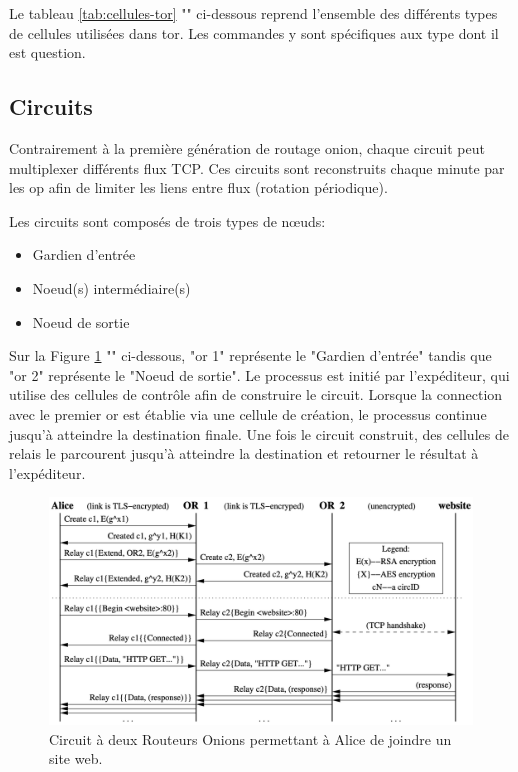 Le tableau \ref{tab:cellules-tor} "" ci-dessous reprend l'ensemble des différents types de cellules utilisées dans \acrshort{tor}.
Les commandes y sont spécifiques aux type dont il est question.



\newpage
\subsection{Circuits}\label{subsec:circuit}

Contrairement à la première génération de routage onion, chaque circuit peut multiplexer différents flux TCP.
Ces circuits sont reconstruits chaque minute par les \acrshort{op} afin de limiter les liens entre flux (rotation périodique).

Les circuits sont composés de trois types de n\oe uds:
\begin{itemize}
    \item Gardien d'entrée
    \item Noeud(s) intermédiaire(s)
    \item Noeud de sortie
\end{itemize}


Sur la Figure \ref{fig:flowdiagram} "" ci-dessous, "\acrshort{or} 1" représente le "Gardien d'entrée" tandis que "\acrshort{or} 2" représente le "Noeud de sortie".
Le processus est initié par l'expéditeur, qui utilise des cellules de contrôle afin de construire le circuit.
Lorsque la connection avec le premier  \acrshort{or}  est établie via une cellule de création, le processus continue jusqu'à atteindre la destination finale.
Une fois le circuit construit, des cellules de relais le parcourent jusqu'à atteindre la destination et retourner le résultat à l'expéditeur.

\begin{figure}[h!]
    \centering
    \includegraphics[width=\linewidth]{Images/Diagrams/flow.png}
    \caption{Circuit à deux Routeurs Onions permettant à Alice de joindre un site web.\cite[Tor: The Second-Generation Onion Router]{dingledine_tor_2004}}
    \label{fig:flowdiagram}
\end{figure}
